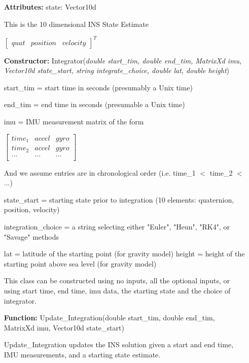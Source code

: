 \documentclass[11pt,a4paper]{article}
\begin{document}
	\begin{itemize}
		\item[\textbf{Attributes:}] state:  Vector10d
		
		This is the 10 dimensional INS State Estimate 
		
		$\left[\begin{array}{ccc}quat & position & velocity\end{array}\right]^T$
		
		\item[\textbf{Constructor:}] Integrator(\textit{double start\_tim, double end\_tim, MatrixXd imu, Vector10d state\_start, string integrate\_choice, double lat, double height})

		start\_tim = start time in seconds (presumably a Unix time)

        end\_tim = end time in seconds (presumable a Unix time)

        imu = IMU measurement matrix of the form
        
		$\left[\begin{array}{ccc}
					time_1 & accel & gyro \\
					time_2 & accel & gyro \\
					...    & ...   & ...  \\	
		\end{array}\right]$
		
		And we assume entries are in chronological order (i.e. time\_1 $<$ time\_2 $<$ ...)
        
        state\_start = starting state prior to integration (10 elements: quaternion, position, velocity)
        
        integration\_choice = a string selecting either "Euler", "Heun", "RK4", or "Savage" methods
        
        lat = latitude of the starting point (for gravity model)
        height = height of the starting point above sea level (for gravity model)		
		
		This class can be constructed using no inputs, all the optional inputs, or using start time, end time, imu data, the starting state and the choice of integrator.
		
		\item[\textbf{Function:}] Update\_Integration(double start\_tim, double end\_tim, MatrixXd imu, Vector10d state\_start)
					
		Update\_Integration updates the INS solution given a start and end time, IMU measurements, and a starting state estimate.
		

\end{itemize}
\end{document}
